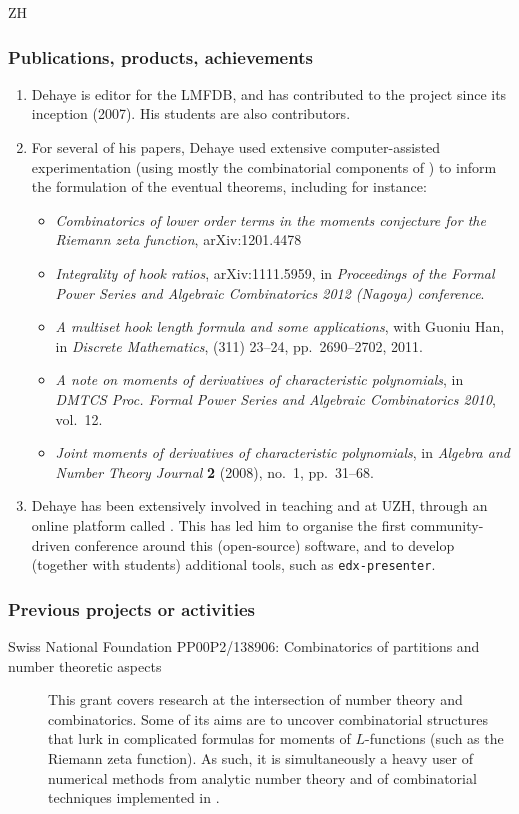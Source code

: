 \begin{sitedescription}{ZH}
\subsubsection*{Publications, products, achievements}
\begin{enumerate}
\item Dehaye is editor for the LMFDB, and has contributed to the project since its inception (2007). His students are also contributors. 
\item For several of his papers, Dehaye used extensive computer-assisted experimentation (using mostly the combinatorial components of \Sage) to inform the formulation of the eventual theorems, including for instance:
\begin{itemize}
\item \emph{Combinatorics of lower order terms in the moments conjecture for the Riemann zeta function}, \textsf{arXiv:1201.4478}
\item \emph{Integrality of hook ratios}, \textsf{arXiv:1111.5959}, in \emph{Proceedings of the Formal Power Series and Algebraic Combinatorics 2012 (Nagoya) conference}.
\item \emph{A multiset hook length formula and some applications}, with Guoniu Han, in \emph{Discrete Mathematics}, (311) 23--24, pp.~2690--2702, 2011.
\item \emph{A note on moments of derivatives of characteristic polynomials}, in \emph{DMTCS Proc. Formal Power Series and Algebraic Combinatorics 2010}, vol.~12.
\item \emph{Joint moments of derivatives of characteristic polynomials}, in \emph{Algebra and Number Theory Journal} {\bf 2} (2008), no.~1,  pp.~31--68.
\end{itemize}
\item Dehaye has been extensively involved in teaching \Python and \Sage at UZH, through an online platform called \OpenEdX. This has led him to organise the first community-driven conference around this (open-source) software, and to develop (together with students) additional tools, such as \texttt{edx-presenter}. 
\end{enumerate}

\subsubsection*{Previous projects or activities}
\begin{description}
\item[Swiss National Foundation PP00P2/138906: Combinatorics of partitions and number theoretic aspects] This grant covers research at the intersection of number theory and combinatorics. Some of its aims are to uncover combinatorial structures that lurk in complicated formulas for moments of $L$-functions (such as the Riemann zeta function). As such, it is simultaneously a heavy user of numerical methods from analytic number theory and of combinatorial techniques implemented in \Sage.
\end{description}


\end{sitedescription}
